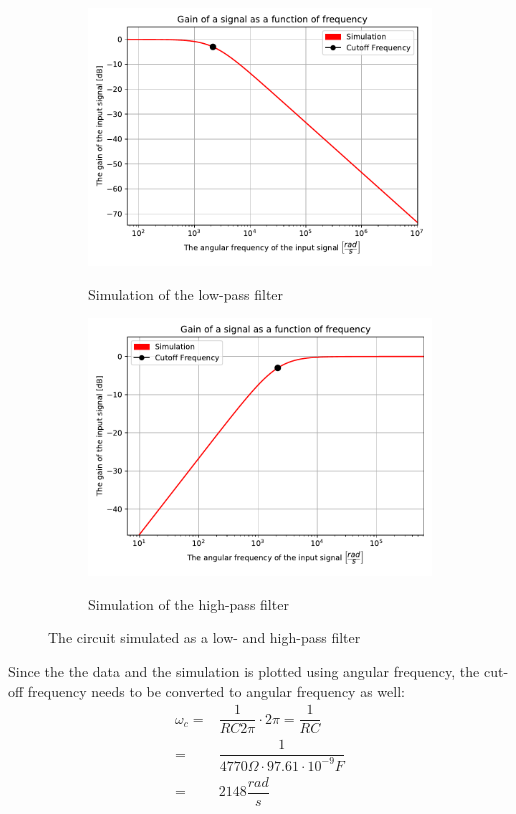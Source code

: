 \begin{figure}[htbp]
\centering
	\begin{subfigure}[b]{0.49\textwidth}
		\includegraphics[width=\textwidth]{fig/img/LPF_sim.pdf}
    		\label{fig:lpf_sim}
    		\caption{Simulation of the low-pass filter}
	\end{subfigure}
	\begin{subfigure}[b]{0.49\textwidth}
		\includegraphics[width=\textwidth]{fig/img/HPF_sim.pdf}
    		\label{fig:hpf_sim}
    		\caption{Simulation of the high-pass filter}
	\end{subfigure}
\caption{The circuit simulated as a low- and high-pass filter}
\end{figure}
Since the the data and the simulation is plotted using angular frequency, the cut-off frequency needs to be converted to angular frequency as well:
\begin{align}
	\omega _c =& \dfrac{1}{RC2\pi} \cdot 2\pi = \dfrac{1}{RC} \nonumber \\
			  =& \dfrac{1}{4770 \Omega \cdot 97.61 \cdot 10^{-9} F} \nonumber \\
			  =& 2148 \dfrac{rad}{s} \label{sim:cut}
\end{align}

